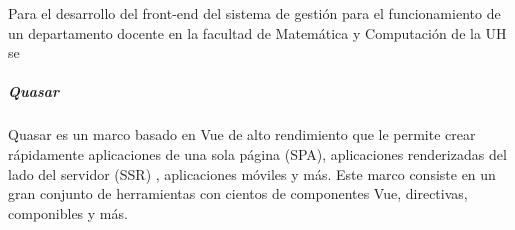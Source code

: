 Para el desarrollo del front-end del sistema de gestión 
para el funcionamiento de un departamento docente en la facultad
de Matemática y Computación de la UH se 


\subparagraph{Quasar}
Quasar es un marco basado en Vue de alto rendimiento que le 
permite crear rápidamente aplicaciones de una sola página
(SPA), aplicaciones renderizadas del lado del servidor (SSR)
, aplicaciones móviles y más. Este marco consiste en un gran
conjunto de herramientas con cientos de componentes Vue,
directivas, componibles y más.




